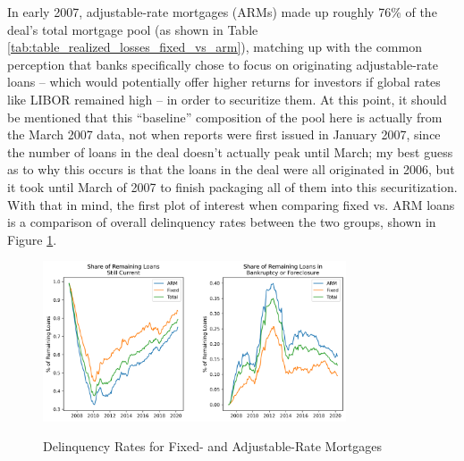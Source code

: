 \documentclass[12pt]{article}
\begin{document}
In early 2007, adjustable-rate mortgages (ARMs) made up roughly 76\% of the deal's total mortgage pool (as shown in Table \ref{tab:table_realized_losses_fixed_vs_arm}), matching up with the common perception that banks specifically chose to focus on originating adjustable-rate loans – which would potentially offer higher returns for investors if global rates like LIBOR remained high – in order to securitize them. At this point, it should be mentioned that this “baseline” composition of the pool here is actually from the March 2007 data, not when reports were first issued in January 2007, since the number of loans in the deal doesn’t actually peak until March; my best guess as to why this occurs is that the loans in the deal were all originated in 2006, but it took until March of 2007 to finish packaging all of them into this securitization. With that in mind, the first plot of interest when comparing fixed vs. ARM loans is a comparison of overall delinquency rates between the two groups, shown in Figure \ref{fig:timeseries_delinq_stats_fixed_vs_arm}.

\begin{figure}[h]
	\centering
	\caption{Delinquency Rates for Fixed- and Adjustable-Rate Mortgages}
	\includegraphics[width=0.8\textwidth]{../figures/timeseries_delinq_status_fixed_vs_arm}
	\label{fig:timeseries_delinq_stats_fixed_vs_arm}
\end{figure}
\end{document}
